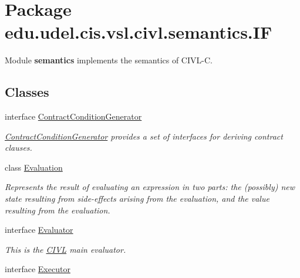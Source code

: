 \hypertarget{namespaceedu_1_1udel_1_1cis_1_1vsl_1_1civl_1_1semantics_1_1IF}{}\section{Package edu.\+udel.\+cis.\+vsl.\+civl.\+semantics.\+I\+F}
\label{namespaceedu_1_1udel_1_1cis_1_1vsl_1_1civl_1_1semantics_1_1IF}


Module {\bfseries semantics} implements the semantics of C\+I\+V\+L-\/\+C.  


\subsection*{Classes}
\begin{DoxyCompactItemize}
\item 
interface \hyperlink{interfaceedu_1_1udel_1_1cis_1_1vsl_1_1civl_1_1semantics_1_1IF_1_1ContractConditionGenerator}{Contract\+Condition\+Generator}
\begin{DoxyCompactList}\small\item\em \hyperlink{interfaceedu_1_1udel_1_1cis_1_1vsl_1_1civl_1_1semantics_1_1IF_1_1ContractConditionGenerator}{Contract\+Condition\+Generator} provides a set of interfaces for deriving contract clauses. \end{DoxyCompactList}\item 
class \hyperlink{classedu_1_1udel_1_1cis_1_1vsl_1_1civl_1_1semantics_1_1IF_1_1Evaluation}{Evaluation}
\begin{DoxyCompactList}\small\item\em Represents the result of evaluating an expression in two parts\+: the (possibly) new state resulting from side-\/effects arising from the evaluation, and the value resulting from the evaluation. \end{DoxyCompactList}\item 
interface \hyperlink{interfaceedu_1_1udel_1_1cis_1_1vsl_1_1civl_1_1semantics_1_1IF_1_1Evaluator}{Evaluator}
\begin{DoxyCompactList}\small\item\em This is the \hyperlink{classedu_1_1udel_1_1cis_1_1vsl_1_1civl_1_1CIVL}{C\+I\+V\+L} main evaluator. \end{DoxyCompactList}\item 
interface \hyperlink{interfaceedu_1_1udel_1_1cis_1_1vsl_1_1civl_1_1semantics_1_1IF_1_1Executor}{Executor}
\item 

\end{DoxyCompactItemize}
